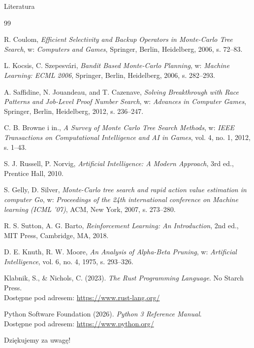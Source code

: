 \documentclass[10pt, aspectratio=169]{beamer}
\begin{document}
\begin{frame}[allowframebreaks]{Literatura}
    \scriptsize
    \begin{thebibliography}{99}

    R. Coulom, 
    \textit{Efficient Selectivity and Backup Operators in Monte-Carlo Tree Search}, 
    w: \textit{Computers and Games}, 
    Springer, Berlin, Heidelberg, 2006, s. 72--83.
    
    L. Kocsis, C. Szepesv{\'a}ri, 
    \textit{Bandit Based Monte-Carlo Planning}, 
    w: \textit{Machine Learning: ECML 2006}, 
    Springer, Berlin, Heidelberg, 2006, s. 282--293.
    
    A. Saffidine, N. Jouandeau, and T. Cazenave, 
    \textit{Solving Breakthrough with Race Patterns and Job-Level Proof Number Search}, 
    w: \textit{Advances in Computer Games}, 
    Springer, Berlin, Heidelberg, 2012, s. 236--247.
    
    C. B. Browne i in., 
    \textit{A Survey of Monte Carlo Tree Search Methods}, 
    w: \textit{IEEE Transactions on Computational Intelligence and AI in Games}, 
    vol. 4, no. 1, 2012, s. 1--43.
    
    S. J. Russell, P. Norvig, 
    \textit{Artificial Intelligence: A Modern Approach}, 
    3rd ed., Prentice Hall, 2010.
    
    S. Gelly, D. Silver, 
    \textit{Monte-Carlo tree search and rapid action value estimation in computer Go}, 
    w: \textit{Proceedings of the 24th international conference on Machine learning (ICML '07)}, 
    ACM, New York, 2007, s. 273--280.
    
    R. S. Sutton, A. G. Barto, 
    \textit{Reinforcement Learning: An Introduction}, 
    2nd ed., MIT Press, Cambridge, MA, 2018.
    
    D. E. Knuth, R. W. Moore, 
    \textit{An Analysis of Alpha-Beta Pruning}, 
    w: \textit{Artificial Intelligence}, vol. 6, no. 4, 1975, s. 293--326.
    
    Klabnik, S., \& Nichols, C. (2023). 
    \textit{The Rust Programming Language}. 
    No Starch Press. \\
    Dostępne pod adresem: \url{https://www.rust-lang.org/}
    
    Python Software Foundation (2026). 
    \textit{Python 3 Reference Manual}. \\
    Dostępne pod adresem: \url{https://www.python.org/}

    \end{thebibliography}
\end{frame}

\begin{frame}[standout]
    Dziękujemy za uwagę!
\end{frame}
\end{document}
